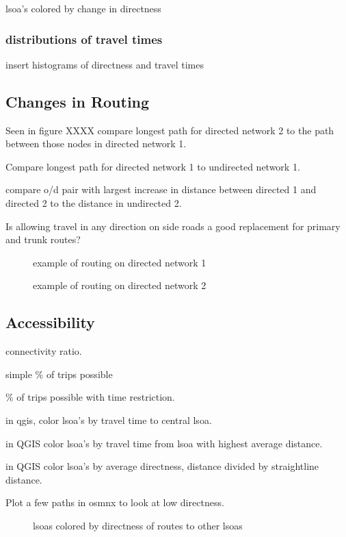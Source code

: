 lsoa's colored by change in directness 


\subsubsection{distributions of travel times}

insert histograms of directness and travel times

\subsection{Changes in Routing}

Seen in figure XXXX  compare longest path for directed network 2 to the path between those nodes in directed network 1. 

Compare longest path for directed network 1 to undirected network 1. 

compare o/d pair with largest increase in distance between directed 1 and directed 2 to the distance in undirected 2. 

Is allowing travel in any direction on side roads a good replacement for primary and trunk routes?


\begin{figure}
\centering
\caption{example of routing on directed network 1}
\label{fig:routing_1}
\end{figure}

\begin{figure}
\centering
\caption{example of routing on directed network 2}
\label{fig:routing_1}
\end{figure}


\subsection{Accessibility}

connectivity ratio. 

simple \% of trips possible

\% of trips possible with time restriction. 

in qgis, color lsoa's by travel time to central lsoa. 

in QGIS color lsoa's by travel time from lsoa with highest average distance. 

in QGIS color lsoa's by  average directness, distance divided by straightline distance. 

Plot a few paths in osmnx to look at low directness. 


\begin{figure}
\centering
\caption{lsoas colored by directness of routes to other lsoas}
\label{fig:lsoa_directness}
\end{figure}



